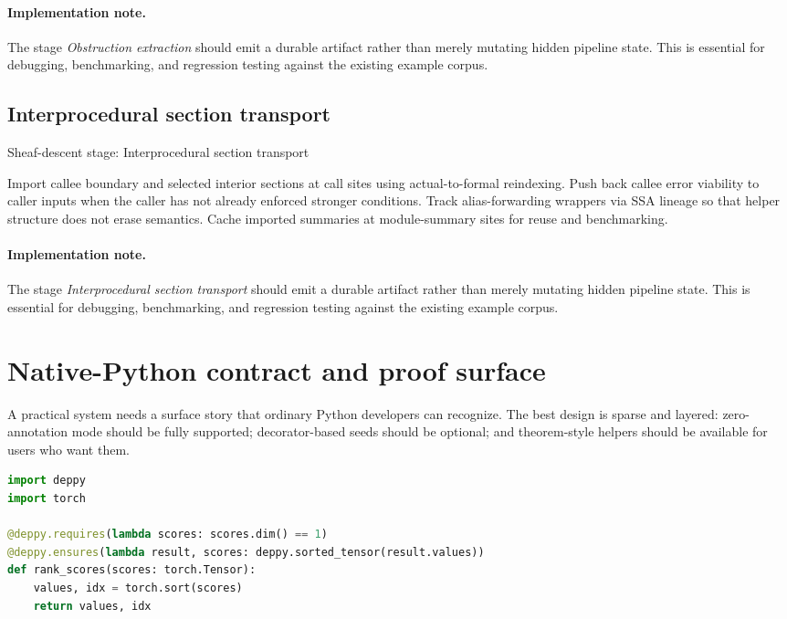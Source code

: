 \documentclass[11pt]{report}
\theoremstyle{definition}
\theoremstyle{plain}
\begin{document}
\paragraph{Implementation note.}
The stage \emph{Obstruction extraction} should emit a durable artifact rather than merely
mutating hidden pipeline state. This is essential for debugging, benchmarking,
and regression testing against the existing example corpus.

\subsection{Interprocedural section transport}

\begin{algorithm}[H]
\caption{Sheaf-descent stage: Interprocedural section transport}
\begin{algorithmic}[1]
\State Import callee boundary and selected interior sections at call sites using actual-to-formal reindexing.
\State Push back callee error viability to caller inputs when the caller has not already enforced stronger conditions.
\State Track alias-forwarding wrappers via SSA lineage so that helper structure does not erase semantics.
\State Cache imported summaries at module-summary sites for reuse and benchmarking.
\end{algorithmic}
\end{algorithm}


\paragraph{Implementation note.}
The stage \emph{Interprocedural section transport} should emit a durable artifact rather than merely
mutating hidden pipeline state. This is essential for debugging, benchmarking,
and regression testing against the existing example corpus.


\section{Native-Python contract and proof surface}

A practical system needs a surface story that ordinary Python developers can
recognize. The best design is sparse and layered: zero-annotation mode should be
fully supported; decorator-based seeds should be optional; and theorem-style
helpers should be available for users who want them.

\begin{lstlisting}[style=deppy,language=Python]
import deppy
import torch

@deppy.requires(lambda scores: scores.dim() == 1)
@deppy.ensures(lambda result, scores: deppy.sorted_tensor(result.values))
def rank_scores(scores: torch.Tensor):
    values, idx = torch.sort(scores)
    return values, idx
\end{lstlisting}
\end{document}
